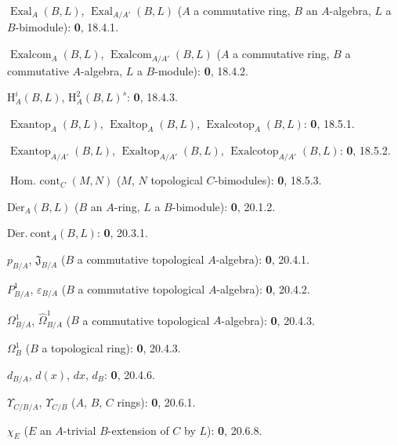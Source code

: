 $\operatorname{Exal}_A(B,L)$, $\operatorname{Exal}_{A/A'}(B,L)$ ($A$ a commutative ring, $B$ an $A$-algebra, $L$ a $B$-bimodule): \textbf{0}, 18.4.1.\par
$\operatorname{Exalcom}_A(B,L)$, $\operatorname{Exalcom}_{A/A'}(B,L)$ ($A$ a commutative ring, $B$ a commutative $A$-algebra, $L$ a $B$-module): \textbf{0}, 18.4.2.\par
$\mathrm H_A^i(B,L)$, $\mathrm H_A^2(B,L)^s$: \textbf{0}, 18.4.3.\par
$\operatorname{Exantop}_A(B,L)$, $\operatorname{Exaltop}_A(B,L)$,
$\operatorname{Exalcotop}_A(B,L)$: \textbf{0}, 18.5.1.\par
$\operatorname{Exantop}_{A/A'}(B,L)$, $\operatorname{Exaltop}_{A/A'}(B,L)$,
$\operatorname{Exalcotop}_{A/A'}(B,L)$: \textbf{0}, 18.5.2.\par
$\operatorname{Hom.\ cont}_C(M,N)$ ($M$, $N$ topological $C$-bimodules): \textbf{0}, 18.5.3.\par
$\operatorname{D\acute{e}r}_A(B,L)$ ($B$ an $A$-ring, $L$ a $B$-bimodule): \textbf{0}, 20.1.2.\par
$\operatorname{D\acute{e}r.\ cont}_A(B,L)$: \textbf{0}, 20.3.1.\par
$p_{B/A}$, $\mathfrak J_{B/A}$ ($B$ a commutative topological $A$-algebra): \textbf{0}, 20.4.1.\par
$P^1_{B/A}$, $\varepsilon_{B/A}$ ($B$ a commutative topological $A$-algebra): \textbf{0}, 20.4.2.\par
$\Omega^1_{B/A}$, $\widehat{\Omega}^1_{B/A}$ ($B$ a commutative topological $A$-algebra): \textbf{0}, 20.4.3.\par
$\Omega^1_B$ ($B$ a topological ring): \textbf{0}, 20.4.3.\par
$d_{B/A}$, $d(x)$, $dx$, $d_B$: \textbf{0}, 20.4.6.\par
$\Upsilon_{C/B/A}$, $\Upsilon_{C/B}$ ($A$, $B$, $C$ rings): \textbf{0}, 20.6.1.\par
$\chi_E$ ($E$ an $A$-trivial $B$-extension of $C$ by $L$): \textbf{0}, 20.6.8.\par

